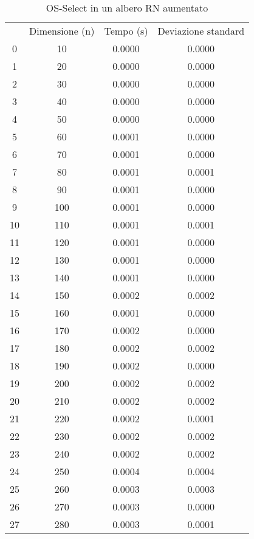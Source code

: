 \begin{table}
\centering
\caption{OS-Select in un albero RN aumentato}
\label{OS-Select in un albero RN aumentato}
\begin{adjustbox}{width=1\textwidth/2}
\begin{tabular}{|c|c|c|c|}
\hline
 & Dimensione (n) & Tempo (s) & Deviazione standard \\
0 & 10 & 0.0000 & 0.0000 \\
\cline{1-4}
1 & 20 & 0.0000 & 0.0000 \\
\cline{1-4}
2 & 30 & 0.0000 & 0.0000 \\
\cline{1-4}
3 & 40 & 0.0000 & 0.0000 \\
\cline{1-4}
4 & 50 & 0.0000 & 0.0000 \\
\cline{1-4}
5 & 60 & 0.0001 & 0.0000 \\
\cline{1-4}
6 & 70 & 0.0001 & 0.0000 \\
\cline{1-4}
7 & 80 & 0.0001 & 0.0001 \\
\cline{1-4}
8 & 90 & 0.0001 & 0.0000 \\
\cline{1-4}
9 & 100 & 0.0001 & 0.0000 \\
\cline{1-4}
10 & 110 & 0.0001 & 0.0001 \\
\cline{1-4}
11 & 120 & 0.0001 & 0.0000 \\
\cline{1-4}
12 & 130 & 0.0001 & 0.0000 \\
\cline{1-4}
13 & 140 & 0.0001 & 0.0000 \\
\cline{1-4}
14 & 150 & 0.0002 & 0.0002 \\
\cline{1-4}
15 & 160 & 0.0001 & 0.0000 \\
\cline{1-4}
16 & 170 & 0.0002 & 0.0000 \\
\cline{1-4}
17 & 180 & 0.0002 & 0.0002 \\
\cline{1-4}
18 & 190 & 0.0002 & 0.0000 \\
\cline{1-4}
19 & 200 & 0.0002 & 0.0002 \\
\cline{1-4}
20 & 210 & 0.0002 & 0.0002 \\
\cline{1-4}
21 & 220 & 0.0002 & 0.0001 \\
\cline{1-4}
22 & 230 & 0.0002 & 0.0002 \\
\cline{1-4}
23 & 240 & 0.0002 & 0.0002 \\
\cline{1-4}
24 & 250 & 0.0004 & 0.0004 \\
\cline{1-4}
25 & 260 & 0.0003 & 0.0003 \\
\cline{1-4}
26 & 270 & 0.0003 & 0.0000 \\
\cline{1-4}
27 & 280 & 0.0003 & 0.0001 \\

\end{tabular}
\end{adjustbox}
\end{table}
